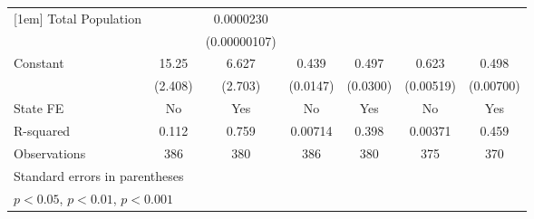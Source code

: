 {\begin{tabular}{l*{6}{c}}
[1em]
Total Population    &                     &   0.0000230\sym{***}&                     &                     &                     &                     \\
                    &                     &(0.00000107)         &                     &                     &                     &                     \\
[1em]
Constant            &       15.25\sym{***}&       6.627\sym{*}  &       0.439\sym{***}&       0.497\sym{***}&       0.623\sym{***}&       0.498\sym{***}\\
                    &     (2.408)         &     (2.703)         &    (0.0147)         &    (0.0300)         &   (0.00519)         &   (0.00700)         \\
\hline
State FE            &          No         &         Yes         &          No         &         Yes         &          No         &         Yes         \\
R-squared           &       0.112         &       0.759         &     0.00714         &       0.398         &     0.00371         &       0.459         \\
Observations        &         386         &         380         &         386         &         380         &         375         &         370         \\
\hline\hline
\multicolumn{7}{l}{\footnotesize Standard errors in parentheses}\\
\multicolumn{7}{l}{\footnotesize \sym{*} \(p<0.05\), \sym{**} \(p<0.01\), \sym{***} \(p<0.001\)}\\
\end{tabular}
}
